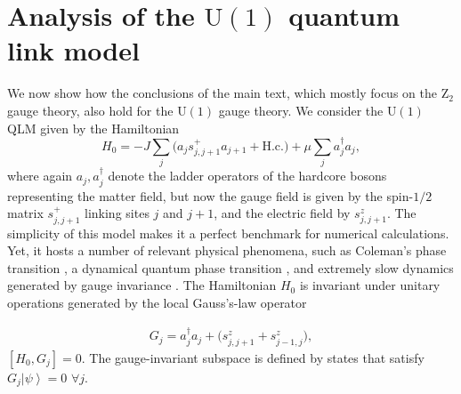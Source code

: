 \documentclass[aps,prl,reprint,twocolumn,superscriptaddress,floatfix,nofootinbib]{revtex4-1}
\begin{document}
\section{Analysis of the $\mathrm{U}(1)$ quantum link model}\label{sec:U1}
We now show how the conclusions of the main text, which mostly focus on the $\mathrm{Z}_2$ gauge theory, also hold for the $\mathrm{U}(1)$ gauge theory. We consider the $\mathrm{U}(1)$ QLM given by the Hamiltonian
\begin{equation}\label{eq:Ham0}
H_0=-J\sum_j\big(a_j s_{j,j+1}^+a_{j+1}+\text{H.c.}\big)+\mu\sum_ja_j^\dagger a_j,
\end{equation}
where again $a_j,a_j^\dagger$ denote the ladder operators of the hardcore bosons representing the matter field, but now the gauge field is given by the spin-$1/2$ matrix $s^+_{j,j+1}$ linking sites $j$ and $j+1$, and the electric field by $s^z_{j,j+1}$. The simplicity of this model makes it a perfect benchmark for numerical calculations. Yet, it hosts a number of relevant physical phenomena, such as Coleman's phase transition \cite{Coleman1976-S}, a dynamical quantum phase transition \cite{Huang2019-S}, and extremely slow dynamics generated by gauge invariance \cite{Brenes2018-S}. 
The Hamiltonian $H_0$ is invariant under unitary operations generated by the local Gauss's-law operator

\begin{align}\label{eq:GaussU1}
G_j=a_j^\dagger a_j+\big(s_{j,j+1}^z+s_{j-1,j}^z\big),
\end{align}
$[H_0,G_j]=0$. 
The gauge-invariant subspace is defined by states that satisfy $G_j\left|\psi\right\rangle=0$ $\forall j$. 
\end{document}
